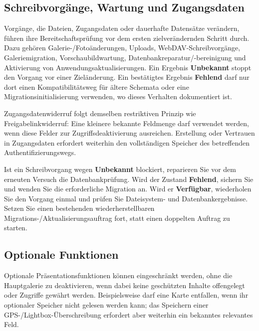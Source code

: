 \documentclass[11pt,a4paper]{article}
\newcommand{\ui}[1]{\textbf{#1}}
\begin{document}
\subsection{Schreibvorgänge, Wartung und Zugangsdaten}

Vorgänge, die Dateien, Zugangsdaten oder dauerhafte Datensätze verändern, führen
ihre Bereitschaftsprüfung vor dem ersten zielverändernden Schritt durch. Dazu
gehören Galerie-/Fotoänderungen, Uploads, WebDAV-Schreibvorgänge,
Galeriemigration, Vorschaubildwartung, Datenbankreparatur/-bereinigung und
Aktivierung von Anwendungsaktualisierungen. Ein Ergebnis \ui{Unbekannt} stoppt
den Vorgang vor einer Zieländerung. Ein bestätigtes Ergebnis \ui{Fehlend} darf
nur dort einen Kompatibilitätsweg für ältere Schemata oder eine
Migrationsinitialisierung verwenden, wo dieses Verhalten dokumentiert ist.

Zugangsdatenwiderruf folgt demselben restriktiven Prinzip wie
Freigabelinkwiderruf: Eine kleinere bekannte Feldmenge darf verwendet werden,
wenn diese Felder zur Zugriffsdeaktivierung ausreichen. Erstellung oder
Vertrauen in Zugangsdaten erfordert weiterhin den vollständigen Speicher des
betreffenden Authentifizierungswegs.

Ist ein Schreibvorgang wegen \ui{Unbekannt} blockiert, reparieren Sie vor dem
erneuten Versuch die Datenbankprüfung. Wird der Zustand \ui{Fehlend}, sichern
Sie und wenden Sie die erforderliche Migration an. Wird er \ui{Verfügbar},
wiederholen Sie den Vorgang einmal und prüfen Sie Dateisystem- und
Datenbankergebnisse. Setzen Sie einen bestehenden wiederherstellbaren
Migrations-/Aktualisierungsauftrag fort, statt einen doppelten Auftrag zu
starten.

\subsection{Optionale Funktionen}

Optionale Präsentationsfunktionen können eingeschränkt werden, ohne die
Hauptgalerie zu deaktivieren, wenn dabei keine geschützten Inhalte offengelegt
oder Zugriffe gewährt werden. Beispielsweise darf eine Karte entfallen, wenn ihr
optionaler Speicher nicht gelesen werden kann; das Speichern einer
GPS-/Lightbox-Überschreibung erfordert aber weiterhin ein bekanntes relevantes
Feld.
\end{document}
